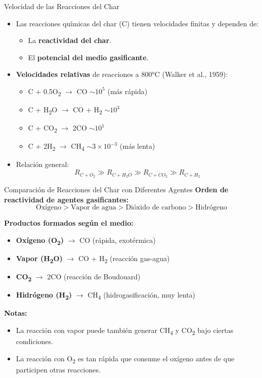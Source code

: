 \documentclass[../../main.tex]{subfiles}
\begin{document}
\begin{frame}{Velocidad de las Reacciones del Char}
\small
\begin{itemize}
  \item Las reacciones químicas del char (C) tienen velocidades finitas y dependen de:
  \begin{itemize}
    \item La \textbf{reactividad del char}.
    \item El \textbf{potencial del medio gasificante}.
  \end{itemize}

  \item \textbf{Velocidades relativas} de reacciones a 800°C (Walker et al., 1959):
  \begin{itemize}
    \item C + 0.5O\textsubscript{2} $\rightarrow$ CO \hfill $\sim 10^5$ (más rápida)
    \item C + H\textsubscript{2}O $\rightarrow$ CO + H\textsubscript{2} \hfill $\sim 10^3$
    \item C + CO\textsubscript{2} $\rightarrow$ 2CO \hfill $\sim 10^1$
    \item C + 2H\textsubscript{2} $\rightarrow$ CH\textsubscript{4} \hfill $\sim 3 \times 10^{-3}$ (más lenta)
  \end{itemize}

  \item Relación general:
  \[
  R_{C+O_2} \gg R_{C+H_2O} \gg R_{C+CO_2} \gg R_{C+H_2}
  \]
\end{itemize}
\end{frame}

\begin{frame}{Comparación de Reacciones del Char con Diferentes Agentes}
\small
\textbf{Orden de reactividad de agentes gasificantes:}
\[
\text{Oxígeno} > \text{Vapor de agua} > \text{Dióxido de carbono} > \text{Hidrógeno}
\]

\vspace{0.5em}
\textbf{Productos formados según el medio:}
\begin{itemize}
  \item \textbf{Oxígeno (O\textsubscript{2})} $\rightarrow$ CO (rápida, exotérmica)
  \item \textbf{Vapor (H\textsubscript{2}O)} $\rightarrow$ CO + H\textsubscript{2} (reacción gas-agua)
  \item \textbf{CO\textsubscript{2}} $\rightarrow$ 2CO (reacción de Boudouard)
  \item \textbf{Hidrógeno (H\textsubscript{2})} $\rightarrow$ CH\textsubscript{4} (hidrogasificación, muy lenta)
\end{itemize}

\vspace{0.5em}
\textbf{Notas:}
\begin{itemize}
  \item La reacción con vapor puede también generar CH\textsubscript{4} y CO\textsubscript{2} bajo ciertas condiciones.
  \item La reacción con O\textsubscript{2} es tan rápida que consume el oxígeno antes de que participen otras reacciones.
\end{itemize}
\end{frame}
\end{document}
